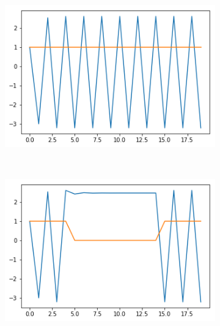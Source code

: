 \documentclass[12pt, letterpaper]{article}
\begin{document}
\begin{figure}[h]
    \centering
    \begin{subfigure}[b]{0.3\textwidth}
        \includegraphics[width=\textwidth]{of1}
        \label{fig:gull}
    \end{subfigure}
    ~ %
    \begin{subfigure}[b]{0.3\textwidth}
        \includegraphics[width=\textwidth]{of2}
        \label{fig:tiger}
    \end{subfigure}
    ~ %
    \begin{subfigure}[b]{0.3\textwidth}

\end{subfigure}
\end{figure}
\end{document}
